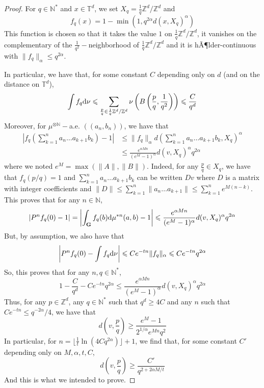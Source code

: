 \documentclass[11pt]{amsart}
\theoremstyle{definition}
\theoremstyle{remark}
\numberwithin{equation}{section}
\begin{document}
\begin{proof}
For $q\in {\mathbb N}^\ast$ and $x\in {\mathbb T}^d$, we set $X_q = \frac 1 q {\mathbb Z}^d/{\mathbb Z}^d$ and
\[
f_q(x) = 1- \min\left(1, q^{2\alpha}d(x,X_q)^\alpha \right) 
\]
This function is chosen so that it takes the value $1$ on $\frac 1 q {\mathbb Z}^d/{\mathbb Z}^d$, it vanishes on the complementary of the $\frac 1 {q^2}-$neighborhood of $\frac 1 q {\mathbb Z}^d/{\mathbb Z}^d$ and it is hÃ¶lder-continuous with $\|f_q\|_\alpha \leqslant q^{2\alpha}$.

In particular, we have that, for some constant $C$ depending only on $d$ (and on the distance on ${\mathbb T}^d$),
\[
\int f_q{{\rm d}}\nu \leqslant \sum_{\frac p q \in \frac 1 q {\mathbb Z}^d/{\mathbb Z}^d} \nu\left(B\left(\frac pq, \frac 1 {q^2}\right) \right) \leqslant \frac C{q^{d}}
\]
Moreover, for $\mu^{\otimes {\mathbb N}}-$a.e. $((a_n,b_n))$, we have that
\begin{align*}
\left|f_q\left(\sum_{k=1}^n a_n \dots a_{k+1} b_k\right) - 1 \right|&\leqslant \|f_q\|_\alpha d\left(\sum_{k=1}^n a_n \dots a_{k+1} b_k, X_q \right)^\alpha \\&\leqslant \frac {e^{\alpha Mn}}{(e^M-1)^\alpha} d(v,X_q)^\alpha q^{2\alpha}
\end{align*}
where we noted $e^M = \max(\|A\|,\|B\|)$. Indeed, for any $\frac pq\in X_q$, we have that $f_q(p/q) = 1$ and $\sum_{k=1}^n a_n \dots a_{k+1} b_k$ can be written $Dv$ where $D$ is a matrix with integer coefficients and $\|D\| \leqslant \sum_{k=1}^n \|a_n \dots a_{k+1}\| \leqslant \sum_{k=1}^n e^{M(n-k)}$.
This proves that for any $n\in {\mathbb N}$,
\[
\left| P^n f_q(0) - 1 \right| = \left|\int_{\mathbf G} f_q(b) {{\rm d}}\mu^{\ast n}(a,b) - 1 \right|\leqslant \frac {e^{\alpha Mn}}{(e^M-1)^\alpha} d(v,X_q)^\alpha q^{2\alpha}
\]
But, by assumption, we also have that
\[
\left|P^n f_q(0) - \int f_q {{\rm d}}\nu\right| \leqslant Ce^{-tn} \|f_q\|_\alpha \leqslant Ce^{-tn}q^{2\alpha}
\]
So, this proves that for any $n,q\in {\mathbb N}^\ast$,
\[
1 - \frac C{q^d} -Ce^{-tn} q^{2\alpha} \leqslant \frac {e^{\alpha Mn}}{(e^M-1)^\alpha} d(v,X_q)^\alpha q^{2\alpha}
\]
Thus, for any $p\in {\mathbb Z}^d$, any $q\in {\mathbb N}^\ast$ such that $q^d \geqslant 4C$ and any $n$ such that $Ce^{-tn} \leqslant q^{-2\alpha}/4$, we have that
\[
d\left(v,\frac p q\right) \geqslant \frac {e^M - 1}{2^{1/\alpha}e^{Mn} q^{2}}
\]
In particular, for $n = \lfloor \frac 1 t \ln(4Cq^{2\alpha}) \rfloor+1$, we find that, for some constant $C'$ depending only on $M,\alpha,t,C$,
\[
d\left( v, \frac pq\right) \geqslant \frac {C'} {q^{2+2\alpha M/t }}
\]
And this is what we intended to prove.
 \end{proof}
 
\end{document}
